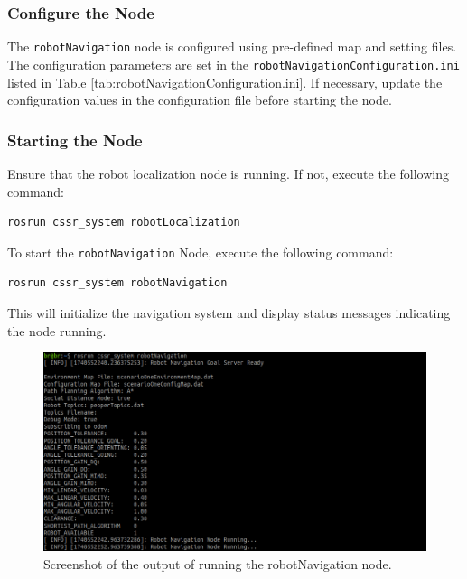 \documentclass{CSSRforAfrica}
\begin{document}
\subsubsection*{Configure the Node}
The \verb|robotNavigation| node is configured using pre-defined map and setting files. The configuration parameters are set in the \verb|robotNavigationConfiguration.ini| listed in Table \ref{tab:robotNavigationConfiguration.ini}. If necessary, update the configuration values in the configuration file before starting the node.

\subsubsection*{Starting the Node}
\begin{notebox}
Ensure that the robot localization node is running. If not, execute the following command:
\begin{lstlisting}[style=withoutNumbering, language=bash]
rosrun cssr_system robotLocalization
\end{lstlisting}
\end{notebox}

\noindent To start the \verb|robotNavigation| Node, execute the following command:
\begin{lstlisting}[style=withoutNumbering, language=bash]
rosrun cssr_system robotNavigation
\end{lstlisting}
This will initialize the navigation system and display status messages indicating the node running.

\begin{figure}[H]
    \centering
    \includegraphics[width=\linewidth]{Images/rosrun_navigation.png}
    \caption{Screenshot of the output of running the robotNavigation node.}
    \label{fig:rosrun_navigation}
\end{figure}
\end{document}
